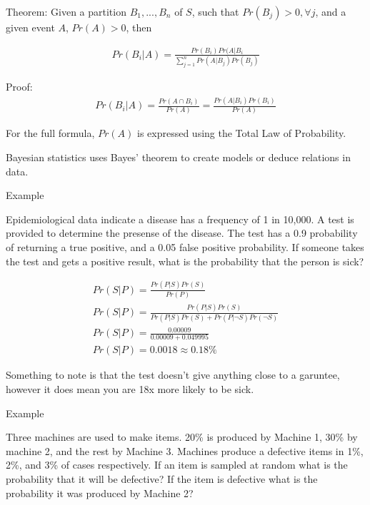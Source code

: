 \documentclass{report}
\begin{document}
\begin{description}
\begin{mdframed}
            Theorem: Given a partition $B_1,...,B_n$ of $S$,
            such that $Pr(B_j) > 0, \forall j$, and a given
            event $A$, $Pr(A) > 0$, then

            \begin{gather}
                Pr(B_i | A) = \frac{Pr(B_i)Pr(A|B_i}{\sum_{j=1}^n Pr(A|B_j)Pr(B_j)}
            \end{gather}

            Proof:
            \begin{gather}
                Pr(B_i | A) = \frac{Pr(A \cap B_i)}{Pr(A)} = \frac{Pr(A | B_i)Pr(B_i)}{Pr(A)}
            \end{gather}

            For the full formula, $Pr(A)$ is expressed using the Total Law of Probability.

            Bayesian statistics uses Bayes' theorem to create models or deduce relations
            in data.
        \end{mdframed}
    \item {\large Example}
        \begin{mdframed}
            Epidemiological data indicate a disease has a frequency of 
            1 in 10,000. A test is provided to determine the presense
            of the disease. The test has a 0.9 probability of returning
            a true positive, and a 0.05 false positive probability. If someone
            takes the test and gets a positive result, what is the probability
            that the person is sick?

            \begin{gather}
                Pr(S | P) = \frac{Pr(P | S) Pr(S)}{Pr(P)}\\
                Pr(S | P) = \frac{Pr(P | S) Pr(S)}{Pr(P|S)Pr(S) + Pr(P| \neg S)Pr(\neg S)}\\
                Pr(S | P) = \frac{0.00009}{0.00009 + 0.049995}\\
                Pr(S | P) = 0.0018 \approx 0.18\%
            \end{gather}

            Something to note is that the test doesn't give anything
            close to a garuntee, however it does mean you are
            18x more likely to be sick. 

        \end{mdframed}
    \item {\large Example}
        \begin{mdframed}
            Three machines are used to make items. 20\% is produced by
            Machine 1, 30\% by machine 2, and the rest by Machine 3.
            Machines produce a defective items in 1\%, 2\%, and 3\%
            of cases respectively. If an item is sampled at random
            what is the probability that it will be defective? If the
            item is defective what is the probability it was produced
            by Machine 2?


\end{mdframed}
\end{description}
\end{document}
